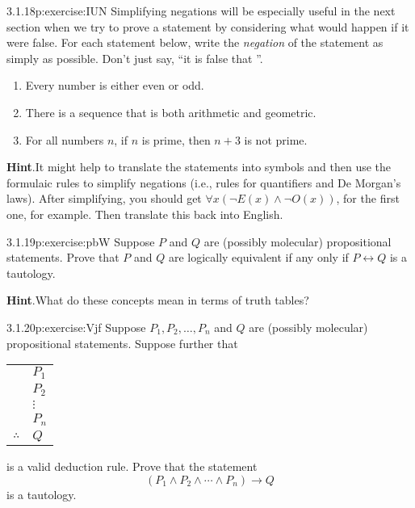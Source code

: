 \documentclass[twoside,11pt,]{book}
\newcommand{\blocktitlefont}{\relax}
\newcommand{\tabularfont}{\relax}
\numberwithin{equation}{chapter}
\newcommand{\hrulethin}  {\noalign{\hrule height 0.04em}}
\renewcommand{\iff}{\leftrightarrow}
\newcommand{\imp}{\rightarrow}
\begin{document}
\begin{divisionsolution}{3.1.18}{}{p:exercise:IUN}%
Simplifying negations will be especially useful in the next section when we try to prove a statement by considering what would happen if it were false.  For each statement below, write the \emph{negation} of the statement as simply as possible.  Don't just say, ``it is false that \textellipsis{}''.%
\begin{enumerate}[label=(\alph*)]
\item{}Every number is either even or odd.%
\item{}There is a sequence that is both arithmetic and geometric.%
\item{}For all numbers \(n\), if \(n\) is prime, then \(n+3\) is not prime.%
\end{enumerate}
%
\par\smallskip%
\noindent\textbf{\blocktitlefont Hint}.\quad{}It might help to translate the statements into symbols and then use the formulaic rules to simplify negations (i.e., rules for quantifiers and De Morgan's laws).  After simplifying, you should get \(\forall x(\neg E(x) \wedge \neg O(x))\), for the first one, for example.  Then translate this back into English.%
\end{divisionsolution}%
\begin{divisionsolution}{3.1.19}{}{p:exercise:pbW}%
Suppose \(P\) and \(Q\) are (possibly molecular) propositional statements. Prove that \(P\) and \(Q\) are logically equivalent if any only if \(P \iff Q\) is a tautology.%
\par\smallskip%
\noindent\textbf{\blocktitlefont Hint}.\quad{}What do these concepts mean in terms of truth tables?%
\end{divisionsolution}%
\begin{divisionsolution}{3.1.20}{}{p:exercise:Vjf}%
Suppose \(P_1, P_2, \ldots, P_n\) and \(Q\) are (possibly molecular) propositional statements. Suppose further that%
\begin{sidebyside}{1}{0}{0}{0}%
\begin{sbspanel}{1}%
{\centering%
{\tabularfont%
\begin{tabular}{ll}
&\(P_1\)\tabularnewline[0pt]
&\(P_2\)\tabularnewline[0pt]
&\(\vdots\)\tabularnewline[0pt]
&\(P_n\)\tabularnewline\hrulethin
\(\therefore\)&\(Q\)
\end{tabular}
}%
\par}
\end{sbspanel}%
\end{sidebyside}%
\par
is a valid deduction rule. Prove that the statement%
\begin{equation*}
(P_1 \wedge P_2 \wedge \cdots \wedge P_n) \imp Q
\end{equation*}
is a tautology.%
\end{divisionsolution}%
\end{document}
